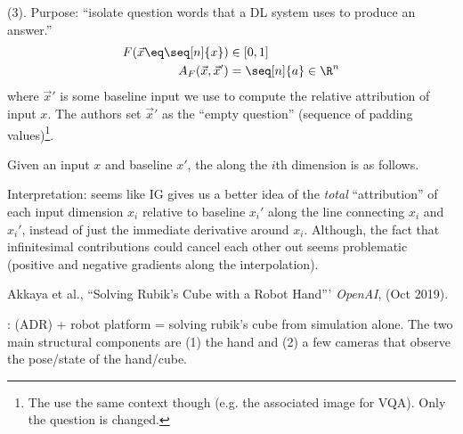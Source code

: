 \documentclass[11pt]{article}
\begin{document}
 (3). Purpose: ``isolate question words that a DL system uses to produce an answer.''
\begin{align}
	F(\vec x \eq \seq[n]{x}) &\in [0, 1] \\
	A_F(\vec x, \vec x')
		&= \seq[n]{a} \in \R^n
\end{align}
where $\vec x'$ is some baseline input we use to compute the relative attribution of input $x$. The authors set $\vec x'$ as the ``empty question'' (sequence of padding values)\footnote{The use the same context though (e.g. the associated image for VQA). Only the question is changed.}.

\begin{definition}
	Given an input $x$ and baseline $x'$, the  along the $i$th dimension is as follows.
\end{definition}
Interpretation: seems like IG gives us a better idea of the \textit{total} ``attribution'' of each input dimension $x_i$ relative to baseline $x_i'$ along the line connecting $x_i$ and $x_i'$, instead of just the immediate derivative around $x_i$. Although, the fact that infinitesimal contributions could cancel each other out seems problematic (positive and negative gradients along the interpolation). 












\vspace{-1em}
{\footnotesize Akkaya et al., ``Solving Rubik's Cube with a Robot Hand''' \textit{OpenAI}, (Oct 2019).}

:  (ADR) + robot platform = solving rubik's cube from simulation alone. The two main structural components are (1) the hand and (2) a few cameras that observe the pose/state of the hand/cube.
\end{document}
